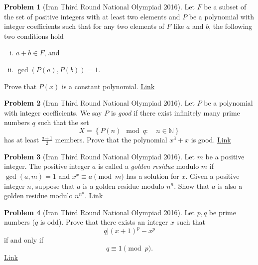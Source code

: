 \documentclass[]{article}
\theoremstyle{definition}
\newtheorem{problem}{Problem}
\begin{document}
\begin{problem}[Iran Third Round National Olympiad 2016]
	Let $F$ be a subset of the set of positive integers with at least two elements and $P$ be a polynomial with integer coefficients such that for any two elements of $F$ like $a$ and $b$, the following two conditions hold
		\begin{enumerate}[(i)]
			\item $a+b \in F$, and
			\item $\gcd(P(a),P(b))=1$.
		\end{enumerate}
	Prove that $P(x)$ is a constant polynomial. \hfill \href{http://artofproblemsolving.com/community/c6h1301958p6940711}{Link}
\end{problem}




\begin{problem}[Iran Third Round National Olympiad 2016]
	Let $P$ be a polynomial with integer coefficients. We say $P$ is \textit{good} if there exist infinitely many prime numbers $q$ such that the set $$X=\left\{P(n) \mod q : \quad n\in \mathbb N\right\}$$
	has at least $\frac{q+1}{2}$ members. Prove that the polynomial $x^3+x$ is good. \hfill \href{http://artofproblemsolving.com/community/c6h1290176p6821252}{Link}
\end{problem}




\begin{problem}[Iran Third Round National Olympiad 2016]
	Let $m$ be a positive integer. The positive integer $a$ is called a \textit{golden residue} modulo $m$ if $\gcd(a,m)=1$ and $x^x \equiv a \pmod m$ has a solution for $x$. Given a positive integer $n$, suppose that $a$ is a golden residue modulo $n^n$. Show that $a$ is also a golden residue modulo $n^{n^n}$. \hfill \href{http://artofproblemsolving.com/community/c6h1301963p6940755}{Link}
\end{problem}




\begin{problem}[Iran Third Round National Olympiad 2016]
	Let $p,q$ be prime numbers ($q$ is odd). Prove that there exists an integer $x$ such that
	$$q |(x+1)^p-x^p$$
	if and only if $$q \equiv 1 \pmod p.$$
	\flushright \href{http://artofproblemsolving.com/community/c6h1300984p6930188}{Link}
\end{problem}
\end{document}
